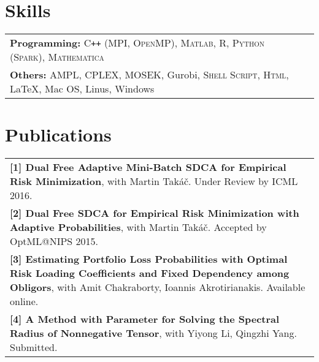 \documentclass[letters,11pt]{article} %
\begin{document}

\section{Skills}
\begin{tabular}{l p{14.5cm}}
 \textbf{Programming:}  \textsc{C\texttt{++} (MPI, OpenMP)}, \textsc{Matlab}, \textsc{R}, \textsc{Python (Spark)}, \textsc{Mathematica}\\
 \textbf{Others:}  AMPL, CPLEX, MOSEK, Gurobi, \textsc{Shell Script}, \textsc{Html}, \LaTeX, Mac OS, Linus, Windows\\
\end{tabular}

\section{Publications}
\begin{tabular}{p{17.7cm}}
    \textbf{[1] Dual Free Adaptive Mini-Batch SDCA for Empirical Risk Minimization}, with Martin Takáč. Under Review by ICML 2016. \\ 
    \textbf{[2] Dual Free SDCA for Empirical Risk Minimization with Adaptive Probabilities}, with Martin Takáč. Accepted by OptML@NIPS 2015.\\
    \textbf{[3] Estimating Portfolio Loss Probabilities with Optimal Risk Loading Coefficients and Fixed Dependency among Obligors}, with Amit Chakraborty, Ioannis Akrotirianakis. Available online.\\
    \textbf{[4] A Method with Parameter for Solving the Spectral Radius of Nonnegative Tensor}, with Yiyong Li, Qingzhi Yang. Submitted.
\end{tabular}
\end{document}
